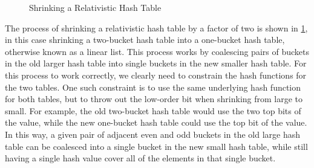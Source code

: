 \begin{figure}
\centering
{}
\caption{Shrinking a Relativistic Hash Table}
\label{fig:datastruct:Shrinking a Relativistic Hash Table}
\end{figure}

The process of shrinking a relativistic hash table by a factor of two
is shown in
\cref{fig:datastruct:Shrinking a Relativistic Hash Table},
in this case shrinking a two-bucket hash table into a one-bucket
hash table, otherwise known as a linear list.
This process works by coalescing pairs of buckets in the old larger hash
table into single buckets in the new smaller hash table.
For this process to work correctly, we clearly need to constrain the hash
functions for the two tables.
One such constraint is to use the same underlying hash function for
both tables, but to throw out the low-order bit when shrinking from
large to small.
For example, the old two-bucket hash table would
use the two top bits of the value, while the new one-bucket hash table
could use the top bit of the value.
In this way, a given pair of adjacent even and odd buckets in the old
large hash table can be coalesced into a single bucket in the new small
hash table, while still having a single hash value cover all of the
elements in that single bucket.

